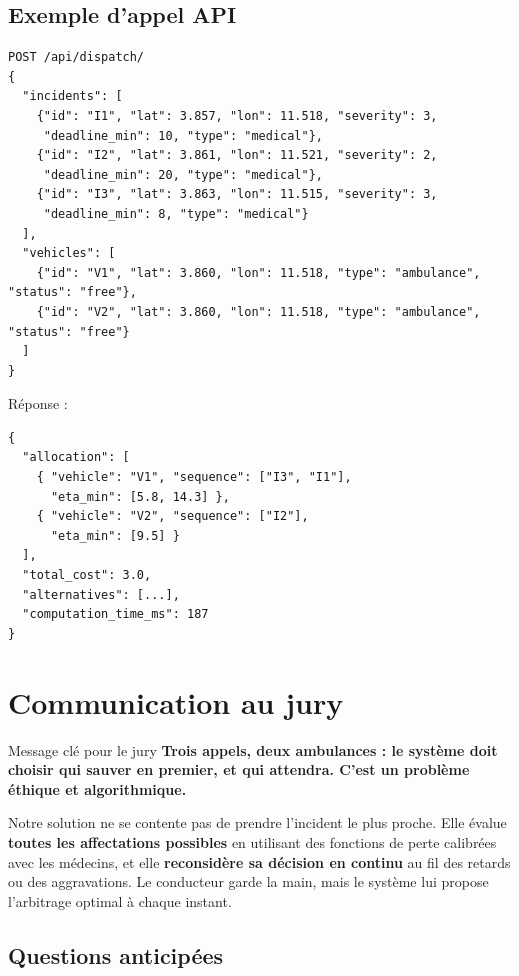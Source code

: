 \documentclass[12pt,a4paper]{article}
\theoremstyle{definition}
\theoremstyle{remark}
\begin{document}
\subsection{Exemple d’appel API}

\begin{verbatim}
POST /api/dispatch/
{
  "incidents": [
    {"id": "I1", "lat": 3.857, "lon": 11.518, "severity": 3,
     "deadline_min": 10, "type": "medical"},
    {"id": "I2", "lat": 3.861, "lon": 11.521, "severity": 2,
     "deadline_min": 20, "type": "medical"},
    {"id": "I3", "lat": 3.863, "lon": 11.515, "severity": 3,
     "deadline_min": 8, "type": "medical"}
  ],
  "vehicles": [
    {"id": "V1", "lat": 3.860, "lon": 11.518, "type": "ambulance", "status": "free"},
    {"id": "V2", "lat": 3.860, "lon": 11.518, "type": "ambulance", "status": "free"}
  ]
}
\end{verbatim}

Réponse :
\begin{verbatim}
{
  "allocation": [
    { "vehicle": "V1", "sequence": ["I3", "I1"],
      "eta_min": [5.8, 14.3] },
    { "vehicle": "V2", "sequence": ["I2"],
      "eta_min": [9.5] }
  ],
  "total_cost": 3.0,
  "alternatives": [...],
  "computation_time_ms": 187
}
\end{verbatim}

\newpage

\section{Communication au jury}

\begin{jurybox}{Message clé pour le jury}
\textbf{Trois appels, deux ambulances : le système doit choisir qui
sauver en premier, et qui attendra. C’est un problème éthique et
algorithmique.}

\medskip
Notre solution ne se contente pas de prendre l’incident le plus
proche. Elle évalue \textbf{toutes les affectations possibles}
en utilisant des fonctions de perte calibrées avec les médecins,
et elle \textbf{reconsidère sa décision en continu} au fil des
retards ou des aggravations. Le conducteur garde la main, mais
le système lui propose l’arbitrage optimal à chaque instant.
\end{jurybox}

\subsection{Questions anticipées}
\end{document}
